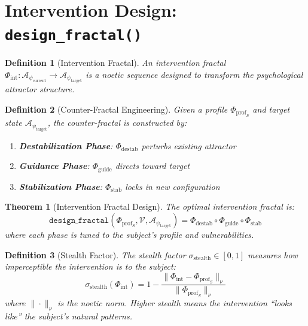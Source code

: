 \documentclass[11pt,twoside]{book}
\newcommand{\Frac}{\Phi}
\newcommand{\PsychAttractor}{\mathcal{A}_\psi}
\newcommand{\ManipFrac}{\Phi_{\mathrm{int}}}
\newcommand{\ProfileFrac}{\Phi_{\mathrm{prof}}}
\newcommand{\VulnSet}{\mathcal{V}}
\newcommand{\StealthFactor}{\sigma_{\mathrm{stealth}}}
\newtheorem{definition}{Definition}[chapter]
\newtheorem{theorem}{Theorem}[chapter]
\begin{document}
\section{Intervention Design: \texttt{design\_fractal()}}

\begin{definition}[Intervention Fractal]
\label{def:intervention-fractal}
An \emph{intervention fractal} $\ManipFrac : \PsychAttractor_{\mathrm{current}} \to
\PsychAttractor_{\mathrm{target}}$ is a noetic sequence designed to transform the
psychological attractor structure.
\end{definition}

\begin{definition}[Counter-Fractal Engineering]
\label{def:counter-fractal}
Given a profile $\ProfileFrac_S$ and target state $\PsychAttractor_{\mathrm{target}}$,
the \emph{counter-fractal} is constructed by:
\begin{enumerate}[label=(\roman*)]
    \item \textbf{Destabilization Phase}: $\Frac_{\mathrm{destab}}$ perturbs existing attractor
    \item \textbf{Guidance Phase}: $\Frac_{\mathrm{guide}}$ directs toward target
    \item \textbf{Stabilization Phase}: $\Frac_{\mathrm{stab}}$ locks in new configuration
\end{enumerate}
\end{definition}

\begin{theorem}[Intervention Fractal Design]
\label{thm:intervention-design}
The optimal intervention fractal is:
\begin{equation}
\boxed{
    \texttt{design\_fractal}(\ProfileFrac_S, \VulnSet, \PsychAttractor_{\mathrm{target}}) =
    \Frac_{\mathrm{destab}} \circ \Frac_{\mathrm{guide}} \circ \Frac_{\mathrm{stab}}
}
\end{equation}
where each phase is tuned to the subject's profile and vulnerabilities.
\end{theorem}

\begin{definition}[Stealth Factor]
\label{def:stealth-factor}
The \emph{stealth factor} $\StealthFactor \in [0, 1]$ measures how imperceptible the
intervention is to the subject:
\[
    \StealthFactor(\ManipFrac) = 1 - \frac{\|\ManipFrac - \ProfileFrac_S\|_\nu}
    {\|\ProfileFrac_S\|_\nu}
\]
where $\|\cdot\|_\nu$ is the noetic norm. Higher stealth means the intervention
``looks like'' the subject's natural patterns.
\end{definition}
\end{document}
